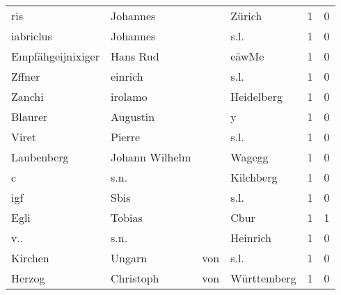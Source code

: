 \begin{center}
\begin{tiny}
\begin{longtabu}{llllrr}
                      ris &                           Johannes &             &                                      Zürich &          1 &         0 \\
                iabriclus &                           Johannes &             &                                        s.l. &          1 &         0 \\
        Empfähgeijnixiger &                           Hans Rud &             &                                       eäwMe &          1 &         0 \\
                   Zffner &                            einrich &             &                                        s.l. &          1 &         0 \\
                   Zanchi &                            irolamo &             &                                  Heidelberg &          1 &         0 \\
                  Blaurer &                           Augustin &             &                                           y &          1 &         0 \\
                    Viret &                             Pierre &             &                                        s.l. &          1 &         0 \\
               Laubenberg &                     Johann Wilhelm &             &                                      Wagegg &          1 &         0 \\
                        c &                               s.n. &             &                                   Kilchberg &          1 &         0 \\
                      igf &                               Sbis &             &                                        s.l. &          1 &         0 \\
                     Egli &                             Tobias &             &                                        Cbur &          1 &         1 \\
                      v.. &                               s.n. &             &                                    Heinrich &          1 &         0 \\
                  Kirchen &                             Ungarn &         von &                                        s.l. &          1 &         0 \\
                   Herzog &                          Christoph &         von &                                 Württemberg &          1 &         0 \\

\end{longtabu}
\end{tiny}
\end{center}
